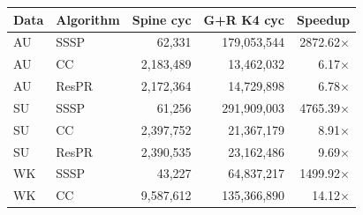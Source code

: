 \begin{tabular}{llrrr}
\toprule
Data & Algorithm & Spine cyc & G+R K4 cyc & Speedup \\
\midrule
AU & SSSP & 62,331 & 179,053,544 & 2872.62$\times$ \\
AU & CC & 2,183,489 & 13,462,032 & 6.17$\times$ \\
AU & ResPR & 2,172,364 & 14,729,898 & 6.78$\times$ \\
SU & SSSP & 61,256 & 291,909,003 & 4765.39$\times$ \\
SU & CC & 2,397,752 & 21,367,179 & 8.91$\times$ \\
SU & ResPR & 2,390,535 & 23,162,486 & 9.69$\times$ \\
WK & SSSP & 43,227 & 64,837,217 & 1499.92$\times$ \\
WK & CC & 9,587,612 & 135,366,890 & 14.12$\times$ \\
\bottomrule
\end{tabular}

